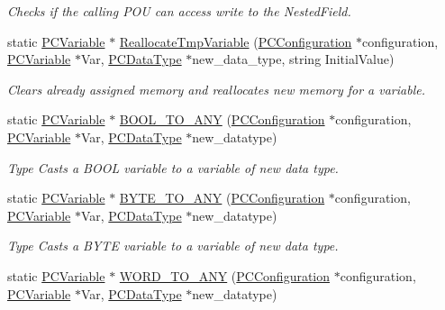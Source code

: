 \begin{DoxyCompactItemize}
\begin{DoxyCompactList}\small\item\em Checks if the calling P\+OU can access write to the Nested\+Field. \end{DoxyCompactList}\item 
static \hyperlink{classpc__emulator_1_1PCVariable}{P\+C\+Variable} $\ast$ \hyperlink{classpc__emulator_1_1Utils_ad4c924801abb39d4dab05cc3000738ad}{Reallocate\+Tmp\+Variable} (\hyperlink{classpc__emulator_1_1PCConfiguration}{P\+C\+Configuration} $\ast$configuration, \hyperlink{classpc__emulator_1_1PCVariable}{P\+C\+Variable} $\ast$Var, \hyperlink{classpc__emulator_1_1PCDataType}{P\+C\+Data\+Type} $\ast$new\+\_\+data\+\_\+type, string Initial\+Value)
\begin{DoxyCompactList}\small\item\em Clears already assigned memory and reallocates new memory for a variable. \end{DoxyCompactList}\item 
static \hyperlink{classpc__emulator_1_1PCVariable}{P\+C\+Variable} $\ast$ \hyperlink{classpc__emulator_1_1Utils_adb6b1dc96a12696b77948f38a5148cac}{B\+O\+O\+L\+\_\+\+T\+O\+\_\+\+A\+NY} (\hyperlink{classpc__emulator_1_1PCConfiguration}{P\+C\+Configuration} $\ast$configuration, \hyperlink{classpc__emulator_1_1PCVariable}{P\+C\+Variable} $\ast$Var, \hyperlink{classpc__emulator_1_1PCDataType}{P\+C\+Data\+Type} $\ast$new\+\_\+datatype)
\begin{DoxyCompactList}\small\item\em Type Casts a B\+O\+OL variable to a variable of new data type. \end{DoxyCompactList}\item 
static \hyperlink{classpc__emulator_1_1PCVariable}{P\+C\+Variable} $\ast$ \hyperlink{classpc__emulator_1_1Utils_a7367ddfa0079890945c8fc81869a9a9d}{B\+Y\+T\+E\+\_\+\+T\+O\+\_\+\+A\+NY} (\hyperlink{classpc__emulator_1_1PCConfiguration}{P\+C\+Configuration} $\ast$configuration, \hyperlink{classpc__emulator_1_1PCVariable}{P\+C\+Variable} $\ast$Var, \hyperlink{classpc__emulator_1_1PCDataType}{P\+C\+Data\+Type} $\ast$new\+\_\+datatype)
\begin{DoxyCompactList}\small\item\em Type Casts a B\+Y\+TE variable to a variable of new data type. \end{DoxyCompactList}\item 
static \hyperlink{classpc__emulator_1_1PCVariable}{P\+C\+Variable} $\ast$ \hyperlink{classpc__emulator_1_1Utils_a8e321a64d2671f0413960b70aa890b19}{W\+O\+R\+D\+\_\+\+T\+O\+\_\+\+A\+NY} (\hyperlink{classpc__emulator_1_1PCConfiguration}{P\+C\+Configuration} $\ast$configuration, \hyperlink{classpc__emulator_1_1PCVariable}{P\+C\+Variable} $\ast$Var, \hyperlink{classpc__emulator_1_1PCDataType}{P\+C\+Data\+Type} $\ast$new\+\_\+datatype)

\end{DoxyCompactItemize}
